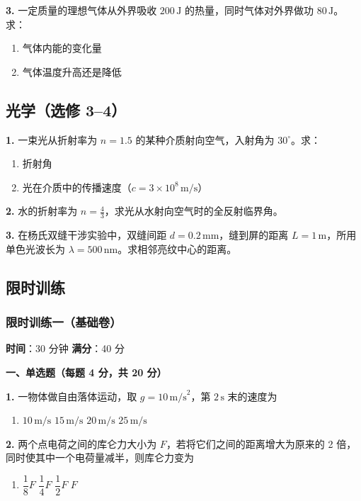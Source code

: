 \textbf{3.} 一定质量的理想气体从外界吸收 $200\,\text{J}$ 的热量，同时气体对外界做功 $80\,\text{J}$。求：
\begin{enumerate}
  \item 气体内能的变化量
  \item 气体温度升高还是降低
\end{enumerate}

\subsection{光学（选修 3--4）}

\textbf{1.} 一束光从折射率为 $n = 1.5$ 的某种介质射向空气，入射角为 $30^\circ$。求：
\begin{enumerate}
  \item 折射角
  \item 光在介质中的传播速度（$c = 3\times10^8\,\text{m/s}$）
\end{enumerate}

\textbf{2.} 水的折射率为 $n = \frac43$，求光从水射向空气时的全反射临界角。

\textbf{3.} 在杨氏双缝干涉实验中，双缝间距 $d = 0.2\,\text{mm}$，缝到屏的距离 $L = 1\,\text{m}$，所用单色光波长为 $\lambda = 500\,\text{nm}$。求相邻亮纹中心的距离。

\subsection{限时训练}

\subsubsection{限时训练一（基础卷）}

\textbf{时间}：30 分钟 \quad \textbf{满分}：40 分

\textbf{一、单选题（每题 4 分，共 20 分）}

\textbf{1.} 一物体做自由落体运动，取 $g = 10\,\text{m/s}^2$，第 $2\,\text{s}$ 末的速度为
\begin{enumerate}
  \item[A.] $10\,\text{m/s}$ \quad [B.] $15\,\text{m/s}$ \quad [C.] $20\,\text{m/s}$ \quad [D.] $25\,\text{m/s}$
\end{enumerate}

\textbf{2.} 两个点电荷之间的库仑力大小为 $F$，若将它们之间的距离增大为原来的 2 倍，同时使其中一个电荷量减半，则库仑力变为
\begin{enumerate}
  \item[A.] $\dfrac18F$ \quad [B.] $\dfrac14F$ \quad [C.] $\dfrac12F$ \quad [D.] $F$
\end{enumerate}


